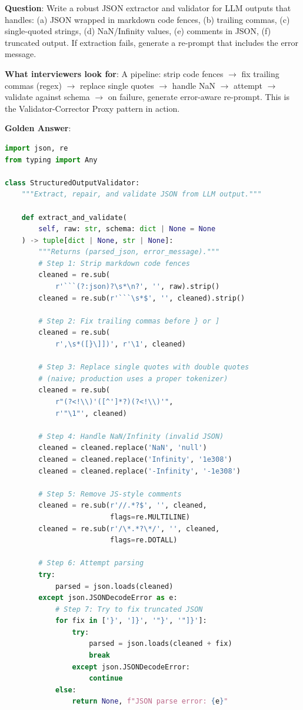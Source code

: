 \textbf{Question}: Write a robust JSON extractor and validator for LLM outputs that handles: (a) JSON wrapped in markdown code fences, (b) trailing commas, (c) single-quoted strings, (d) NaN/Infinity values, (e) comments in JSON, (f) truncated output. If extraction fails, generate a re-prompt that includes the error message.

\textbf{What interviewers look for}: A pipeline: strip code fences $\to$ fix trailing commas (regex) $\to$ replace single quotes $\to$ handle NaN $\to$ attempt  $\to$ validate against schema $\to$ on failure, generate error-aware re-prompt. This is the Validator-Corrector Proxy pattern in action.

\textbf{Golden Answer}:

\begin{lstlisting}[language=Python]
import json, re
from typing import Any

class StructuredOutputValidator:
    """Extract, repair, and validate JSON from LLM output."""

    def extract_and_validate(
        self, raw: str, schema: dict | None = None
    ) -> tuple[dict | None, str | None]:
        """Returns (parsed_json, error_message)."""
        # Step 1: Strip markdown code fences
        cleaned = re.sub(
            r'```(?:json)?\s*\n?', '', raw).strip()
        cleaned = re.sub(r'```\s*$', '', cleaned).strip()

        # Step 2: Fix trailing commas before } or ]
        cleaned = re.sub(
            r',\s*([}\]])', r'\1', cleaned)

        # Step 3: Replace single quotes with double quotes
        # (naive; production uses a proper tokenizer)
        cleaned = re.sub(
            r"(?<!\\)'([^']*?)(?<!\\)'",
            r'"\1"', cleaned)

        # Step 4: Handle NaN/Infinity (invalid JSON)
        cleaned = cleaned.replace('NaN', 'null')
        cleaned = cleaned.replace('Infinity', '1e308')
        cleaned = cleaned.replace('-Infinity', '-1e308')

        # Step 5: Remove JS-style comments
        cleaned = re.sub(r'//.*?$', '', cleaned,
                         flags=re.MULTILINE)
        cleaned = re.sub(r'/\*.*?\*/', '', cleaned,
                         flags=re.DOTALL)

        # Step 6: Attempt parsing
        try:
            parsed = json.loads(cleaned)
        except json.JSONDecodeError as e:
            # Step 7: Try to fix truncated JSON
            for fix in ['}', ']}', '"}', '"]}']:
                try:
                    parsed = json.loads(cleaned + fix)
                    break
                except json.JSONDecodeError:
                    continue
            else:
                return None, f"JSON parse error: {e}"


\end{lstlisting}

